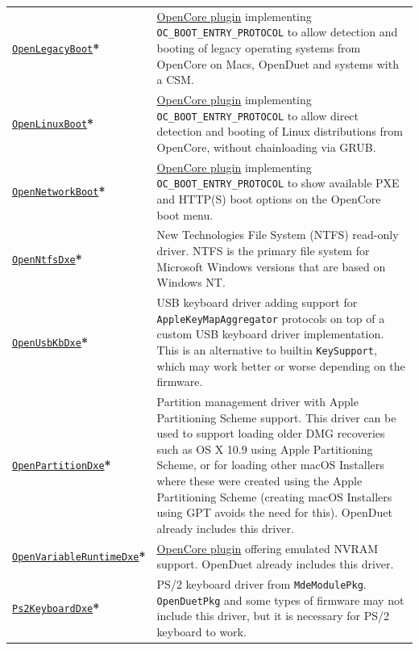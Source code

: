 \documentclass[]{article}
\begin{document}
\begin{longtable}{p{1.65in}p{5.25in}}
\href{https://github.com/acidanthera/OpenCorePkg}{\texttt{OpenLegacyBoot}}\textbf{*}
& \hyperref[legacyboot]{OpenCore plugin} implementing \texttt{OC\_BOOT\_ENTRY\_PROTOCOL}
  to allow detection and booting of legacy operating systems from OpenCore on Macs, OpenDuet
  and systems with a CSM. \\
\href{https://github.com/acidanthera/OpenCorePkg}{\texttt{OpenLinuxBoot}}\textbf{*}
& \hyperref[uefilinux]{OpenCore plugin} implementing \texttt{OC\_BOOT\_ENTRY\_PROTOCOL}
  to allow direct detection and booting of Linux distributions from OpenCore, without
  chainloading via GRUB. \\
\href{https://github.com/acidanthera/OpenCorePkg}{\texttt{OpenNetworkBoot}}\textbf{*}
& \hyperref[uefinetboot]{OpenCore plugin} implementing \texttt{OC\_BOOT\_ENTRY\_PROTOCOL}
  to show available PXE and HTTP(S) boot options on the OpenCore boot menu. \\
\href{https://github.com/acidanthera/OpenCorePkg}{\texttt{OpenNtfsDxe}}\textbf{*}
& New Technologies File System (NTFS) read-only driver.
  NTFS is the primary file system for Microsoft Windows versions that are based on Windows NT. \\
\href{https://github.com/acidanthera/OpenCorePkg}{\texttt{OpenUsbKbDxe}}\textbf{*}
& USB keyboard driver adding support for \texttt{AppleKeyMapAggregator} protocols
  on top of a custom USB keyboard driver implementation. This is an alternative to
  builtin \texttt{KeySupport}, which may work better or worse depending on the firmware. \\
\href{https://github.com/acidanthera/OpenCorePkg}{\texttt{OpenPartitionDxe}}\textbf{*}
& Partition management driver with Apple Partitioning Scheme support.
  This driver can be used to support loading older DMG recoveries such as OS X 10.9
  using Apple Partitioning Scheme, or for loading other macOS Installers where these were
  created using the Apple Partitioning Scheme (creating macOS Installers using GPT avoids
  the need for this). OpenDuet already includes this driver. \\
\href{https://github.com/acidanthera/OpenCorePkg}{\texttt{OpenVariableRuntimeDxe}}\textbf{*}
& \hyperref[emunvram]{OpenCore plugin} offering emulated NVRAM support. OpenDuet already
includes this driver. \\
\href{https://github.com/acidanthera/audk}{\texttt{Ps2KeyboardDxe}}\textbf{*}
& PS/2 keyboard driver from \texttt{MdeModulePkg}. \texttt{OpenDuetPkg} and some types of firmware
  may not include this driver, but it is necessary for PS/2 keyboard to work.

\end{longtable}
\end{document}
